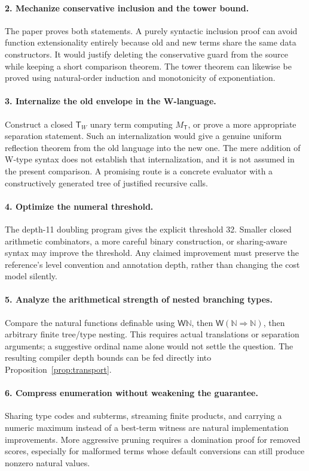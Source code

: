 \documentclass[11pt]{article}
\theoremstyle{definition}
\newcommand{\N}{\mathbb N}
\newcommand{\T}{\mathsf T}
\newcommand{\TW}{\mathsf T_W}
\newcommand{\W}{\mathsf W}
\newcommand{\MT}{M_{\T}}
\begin{document}
\paragraph{2. Mechanize conservative inclusion and the tower bound.}
The paper proves both statements. A purely syntactic inclusion proof can avoid
function extensionality entirely because old and new terms share the same data
constructors. It would justify deleting the conservative guard from the source
while keeping a short comparison theorem. The tower theorem can likewise be
proved using natural-order induction and monotonicity of exponentiation.

\paragraph{3. Internalize the old envelope in the W-language.}
Construct a closed $\TW$ unary term computing $\MT$, or prove a more appropriate
separation statement. Such an internalization would give a genuine uniform
reflection theorem from the old language into the new one. The mere addition
of W-type syntax does not establish that internalization, and it is not assumed
in the present comparison. A promising route is a concrete evaluator with a
constructively generated tree of justified recursive calls.

\paragraph{4. Optimize the numeral threshold.}
The depth-11 doubling program gives the explicit threshold 32. Smaller closed
arithmetic combinators, a more careful binary construction, or sharing-aware
syntax may improve the threshold. Any claimed improvement must preserve the
reference's level convention and annotation depth, rather than changing the
cost model silently.

\paragraph{5. Analyze the arithmetical strength of nested branching types.}
Compare the natural functions definable using $\W\N$, then
$\W(\N\Rightarrow\N)$, then arbitrary finite tree/type nesting. This requires
actual translations or separation arguments; a suggestive ordinal name alone
would not settle the question. The resulting compiler depth bounds can be
fed directly into Proposition~\ref{prop:transport}.

\paragraph{6. Compress enumeration without weakening the guarantee.}
Sharing type codes and subterms, streaming finite products, and carrying a
numeric maximum instead of a best-term witness are natural implementation
improvements. More aggressive pruning requires a domination proof for removed
scores, especially for malformed terms whose default conversions can still
produce nonzero natural values.
\end{document}
